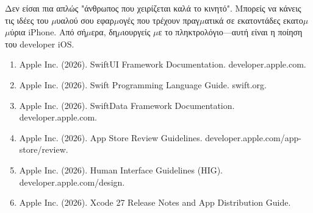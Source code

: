 Δεν είσαι πια απλώς "άνθρωπος που χειρίζεται καλά το κινητό". Μπορείς να κάνεις τις ιδέες του $\mu$υαλού σου εφαρ$\mu$ογές που τρέχουν πραγ$\mu$ατικά σε εκατοντάδες εκατο$\mu$$\mu$ύρια iPhone. Από σή$\mu$ερα, δη$\mu$ιουργείς $\mu$ε το πληκτρολόγιο—αυτή είναι η ποίηση του developer iOS.


\begin{enumerate}
  \item Apple Inc. (2026). SwiftUI Framework Documentation. developer.apple.com.
  \item Apple Inc. (2026). Swift Programming Language Guide. swift.org.
  \item Apple Inc. (2026). SwiftData Framework Documentation. developer.apple.com.
  \item Apple Inc. (2026). App Store Review Guidelines. developer.apple.com/app-store/review.
  \item Apple Inc. (2026). Human Interface Guidelines (HIG). developer.apple.com/design.
  \item Apple Inc. (2026). Xcode 27 Release Notes and App Distribution Guide.
\end{enumerate}
